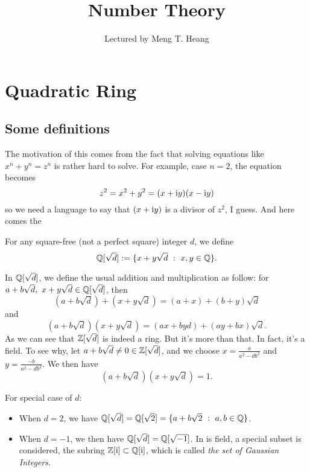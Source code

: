 



\title{Number Theory}
\author{Lectured by Meng T. Heang}

\renewcommand{\bar}[1]{\overline{#1}}


\maketitle


\chapter{Quadratic Ring}

\section{Some definitions}
The motivation of this comes from the fact that solving 
equations like $x^n+y^n=z^n$ is rather hard to solve. For example, 
case $n=2$, the equation becomes
\[z^2=x^2+y^2=(x+\mathrm i y)(x-\mathrm i y)\]
so we need a language to say that $(x+\mathrm i y)$ is a divisor 
of $z^2$, I guess. And here comes the 

\begin{definition}
  For any square-free (not a perfect square) integer $d$,
  we define
  \[\Q[\sqrt{d}]:=\{x+y\sqrt{d}~:~ x,y\in\Q\}.\]
\end{definition}
In $\Q[\sqrt d]$, we define the usual addition and multiplication
as follow: for $a+b\sqrt d,~x+y\sqrt d\in\Q[\sqrt d]$, then
\[ (a+b\sqrt d)+(x+y\sqrt d)=(a+x)+(b+y)\sqrt d \]
and
\[ (a+b\sqrt d)(x+y\sqrt d)=(ax+byd)+(ay+bx)\sqrt d. \]
As we can see that $\Z[\sqrt d]$ is indeed a ring.
But it's more than that. In fact, it's a field. To see why,
let $a+b\sqrt d\neq 0\in\Z[\sqrt d]$, and we choose
$x=\frac{a}{a^2-db^2}$ and $y=\frac{-b}{a^2-db^2}$. We then have
\[(a+b\sqrt d)(x+y\sqrt d)=1.\]

\begin{example}
  For special case of $d$:
  \begin{itemize}
    \item When $d=2$, we have $\Q[\sqrt d]=\Q[\sqrt 2]=\{a+b\sqrt{2}~:~a,b\in\Q\}$.
    \item 
      When $d=-1$, we then have $\Q[\sqrt d]=\Q[\sqrt{-1}]$. In is field,
      a special subset is considered, the subring $\Z[\i]\subset \Q[\i]$,
      which is called \emph{the set of Gaussian Integers}.
  \end{itemize}
\end{example}

